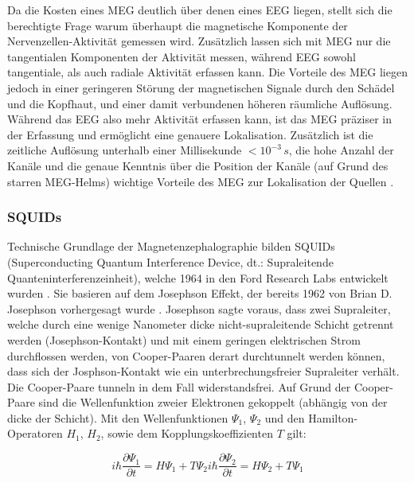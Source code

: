 \documentclass[doc,a4paper,12pt]{apa6}
\begin{document}
Da die Kosten eines MEG deutlich über denen eines EEG liegen, stellt sich die berechtigte Frage warum überhaupt die magnetische Komponente der Nervenzellen-Aktivität gemessen wird. Zusätzlich lassen sich mit MEG nur die tangentialen Komponenten der Aktivität messen, während EEG sowohl tangentiale, als auch radiale Aktivität erfassen kann. Die Vorteile des MEG liegen jedoch in einer geringeren Störung der magnetischen Signale durch den Schädel und die Kopfhaut, und einer damit verbundenen höheren räumliche Auflösung. Während das EEG also mehr Aktivität erfassen kann, ist das MEG präziser in der Erfassung und ermöglicht eine genauere Lokalisation. Zusätzlich ist die zeitliche Auflösung unterhalb einer Millisekunde $< 10^{-3}\,s$, die hohe Anzahl der Kanäle und die genaue Kenntnis über die Position der Kanäle (auf Grund des starren MEG-Helms) wichtige Vorteile des MEG zur Lokalisation der Quellen  \parencite{malmivuo2012comparison}.

\subsubsection{SQUIDs}
\label{sec:squids}

Technische Grundlage der Magnetenzephalographie bilden SQUIDs (Superconducting Quantum Interference Device, dt.: Supraleitende Quanteninterferenzeinheit), welche 1964 in den Ford Research Labs entwickelt wurden \parencite{jaklevic1964quantum}. Sie basieren auf dem Josephson Effekt, der bereits 1962 von Brian D. Josephson vorhergesagt wurde \parencite{josephson1962possible}. Josephson sagte voraus, dass zwei Supraleiter, welche durch eine wenige Nanometer dicke nicht-supraleitende Schicht getrennt werden (Josephson-Kontakt) und mit einem geringen elektrischen Strom durchflossen werden, von Cooper-Paaren derart durchtunnelt werden können, dass sich der Josphson-Kontakt wie ein unterbrechungsfreier Supraleiter verhält. Die Cooper-Paare tunneln in dem Fall widerstandsfrei.
Auf Grund der Cooper-Paare sind die Wellenfunktion zweier Elektronen gekoppelt (abhängig von der dicke der Schicht). Mit den Wellenfunktionen $\Psi_1$, $\Psi_2$ und den Hamilton-Operatoren $H_1$, $H_2$, sowie dem Kopplungskoeffizienten $T$ gilt:

\begin{subequations}
\label{eq:cooper}
  \begin{equation} i\hbar \frac{\partial \Psi_1}{\partial t} = H \Psi_1 + T \Psi_2 \end{equation}
   \begin{equation} i\hbar \frac{\partial \Psi_2}{\partial t} = H \Psi_2 + T \Psi_1 \end{equation}
\end{subequations}
\end{document}
